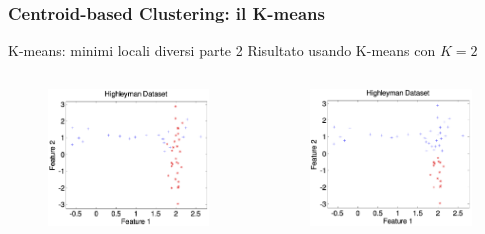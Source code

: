 \begin{frame}

	\frametitle{{\color{GradientDescentDiagramBlue}Centroid-based Clustering}: il K-means}

	\begin{block}{K-means: minimi locali diversi parte 2}
		Risultato usando K-means con $K=2$
		\begin{columns}
			\begin{figure}[!htbp]
				\centering
				\includegraphics[angle=0,width=1\linewidth]{images/unsupervised/kmeans/highley_gt.png}
			\end{figure}

			\begin{figure}[!htbp]
				\centering
				\includegraphics[angle=0,width=1\linewidth]{images/unsupervised/kmeans/highley_2k.png}
			\end{figure}


\end{columns}
\end{block}
\end{frame}
